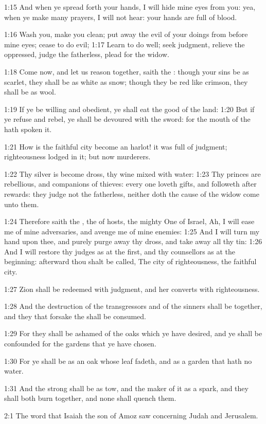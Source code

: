 1:15 And when ye spread forth your hands, I will hide mine eyes from you: yea, when ye make many prayers, I will not hear: your hands are full of blood.

1:16 Wash you, make you clean; put away the evil of your doings from before mine eyes; cease to do evil; 1:17 Learn to do well; seek judgment, relieve the oppressed, judge the fatherless, plead for the widow.

1:18 Come now, and let us reason together, saith the \LORD: though your sins be as scarlet, they shall be as white as snow; though they be red like crimson, they shall be as wool.

1:19 If ye be willing and obedient, ye shall eat the good of the land: 1:20 But if ye refuse and rebel, ye shall be devoured with the sword: for the mouth of the \LORD hath spoken it.

1:21 How is the faithful city become an harlot! it was full of judgment; righteousness lodged in it; but now murderers.

1:22 Thy silver is become dross, thy wine mixed with water: 1:23 Thy princes are rebellious, and companions of thieves: every one loveth gifts, and followeth after rewards: they judge not the fatherless, neither doth the cause of the widow come unto them.

1:24 Therefore saith the \LORD, the \LORD of hosts, the mighty One of Israel, Ah, I will ease me of mine adversaries, and avenge me of mine enemies: 1:25 And I will turn my hand upon thee, and purely purge away thy dross, and take away all thy tin: 1:26 And I will restore thy judges as at the first, and thy counsellors as at the beginning: afterward thou shalt be called, The city of righteousness, the faithful city.

1:27 Zion shall be redeemed with judgment, and her converts with righteousness.

1:28 And the destruction of the transgressors and of the sinners shall be together, and they that forsake the \LORD shall be consumed.

1:29 For they shall be ashamed of the oaks which ye have desired, and ye shall be confounded for the gardens that ye have chosen.

1:30 For ye shall be as an oak whose leaf fadeth, and as a garden that hath no water.

1:31 And the strong shall be as tow, and the maker of it as a spark, and they shall both burn together, and none shall quench them.

2:1 The word that Isaiah the son of Amoz saw concerning Judah and Jerusalem.


